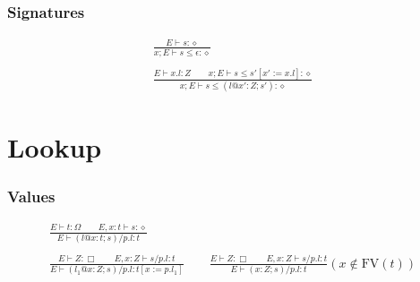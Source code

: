 \documentclass[twoside]{article}
\newcommand{\void}[1]{}
\newcommand{\f}[1]{\mbox{#1}}
\begin{document}
\subsubsection*{Signatures \hfill
{}
}

\begin{displaymath}
\begin{array}{c}
\displaystyle
\void{
\frac{
x;E \vdash s = s' : \diamond
}{
x;E \vdash s \leq s' : \diamond
}
\qquad
\frac{
x;E \vdash s \leq s'' : \diamond
\qquad
x;E \vdash s'' \leq s' : \diamond
}{
x;E \vdash s \leq s' : \diamond
}
\\\\\displaystyle
}
\frac{
E \vdash s : \diamond
}{
x;E \vdash s \leq \epsilon : \diamond
}
\\\\\displaystyle
\frac{
E \vdash x.l : Z
\quad\quad
x;E \vdash s \leq s'[x'\!:=\!x.l] : \diamond
}{
x;E \vdash s \leq (l@x':Z;s') : \diamond
}
\void{
\\\\\displaystyle
\frac{
E \vdash z : Z
\qquad
x;E \vdash s \leq s'[x':=z] : \diamond
}{
x;E \vdash s \leq (x':Z;s') : \diamond
}
\qquad
\frac{
E \vdash Z : \Box
\qquad
x;E,x':Z \vdash s \leq s' : \diamond
}{
x;E \vdash (x':Z;s) \leq s' : \diamond
}
}
\end{array}
\end{displaymath}



\section{Lookup}
\label{lookup}

\subsubsection*{Values \hfill
{}
}

\begin{displaymath}
\begin{array}{c}
\displaystyle
\frac{
E \vdash t : \Omega
\qquad
E,x:t \vdash s : \diamond
}{
E \vdash (l@x:t;s)/p.l : t
}
\\\\\displaystyle
\frac{
E \vdash Z : \Box
\qquad
E,x:Z \vdash s/p.l : t
}{
E \vdash (l_1@x:Z;s)/p.l : t[x:=p.l_1]
}
\qquad
\frac{
E \vdash Z : \Box
\qquad
E,x:Z \vdash s/p.l : t
}{
E \vdash (x:Z;s)/p.l : t
}(x \notin \f{FV}(t))
\end{array}
\end{displaymath}
\end{document}
